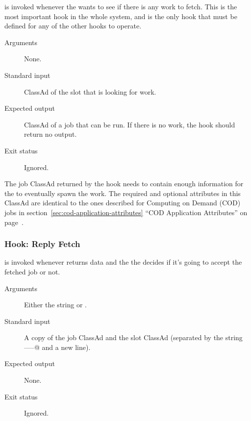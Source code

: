  is invoked whenever the 
wants to see if there is any work to fetch.
This is the most important hook in the whole system, and is the only
hook that must be defined for any of the other  hooks
to operate.

\begin{description}
\item[Arguments]
  None.

\item[Standard input]
  ClassAd of the slot that is looking for work.

\item[Expected output]
  ClassAd of a job that can be run.
  If there is no work, the hook should return no output.

\item[Exit status]
  Ignored.
\end{description}

The job ClassAd returned by the hook needs to contain enough
information for the  to eventually spawn the work.
The required and optional attributes in this ClassAd are identical to
the ones described for Computing on Demand (COD) jobs in
section~\ref{sec:cod-application-attributes} 
``COD Application Attributes'' on
page~\pageref{sec:cod-application-attributes}.


\subsubsection{\label{sec:job-hooks-reply-fetch}
Hook: Reply Fetch}

 is invoked whenever
 returns data and the the 
decides if it's going to accept the fetched job or not.

\begin{description}
\item[Arguments]
  Either the string \verb@accept@ or \verb@reject@.

\item[Standard input]
  A copy of the job ClassAd and the slot ClassAd
  (separated by the string \verb@-----@ and a new line).

\item[Expected output]
  None.

\item[Exit status]
  Ignored.
\end{description}

